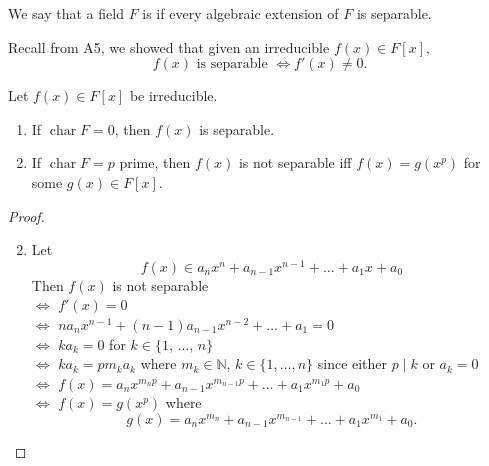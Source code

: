 \documentclass[notoc,notitlepage,nobib]{tufte-book}
\DeclareMathOperator{\Char}{char}
\begin{document}
\begin{defn}\label{defn:perfect_fields}
  We say that a field $F$ is  if every algebraic extension of
  $F$ is separable.
\end{defn}

\begin{note}
  Recall from A5, we showed that given an irreducible $f(x) \in F[x]$,
  \begin{equation*}
    f(x) \text{ is separable } \iff f'(x) \neq 0.
  \end{equation*}
\end{note}

\begin{propo}\label{propo:separability_and_the_characteristic_of_a_field}
  Let $f(x) \in F[x]$ be irreducible.
  \begin{enumerate}
    \item If $\Char F = 0$, then $f(x)$ is separable. 
    \item If $\Char F = p$ prime, then $f(x)$ is not separable iff $f(x) = g(x^p)$
      for some $g(x) \in F[x]$.
  \end{enumerate}
\end{propo}

\begin{proof}
  \begin{enumerate}
    \setcounter{enumi}{1}
    \item Let
      \begin{equation*}
        f(x) \in a_n x^n + a_{n - 1} x^{n - 1} + \hdots + a_1 x + a_0
      \end{equation*}
      Then $f(x)$ is not separable \\
      $\iff$ $f'(x) = 0$ \\
      $\iff$ $na_n x^{n - 1} + (n - 1)a_{n - 1} x^{n - 2} + \hdots + a_1 = 0$
        \\
      $\iff$ $ka_k = 0$ for $k \in \{ 1, \, \ldots, \, n \}$ \\
      $\iff$ $ka_k = pm_k a_k$ where $m_k \in \mathbb{N}$, $k \in \{ 1, \ldots,
        n \}$ since either $p \mid k$ or $a_k = 0$ \\
      $\iff$ $f(x) = a_n x^{m_n p} + a_{n - 1}x^{m_{n - 1} p} + \hdots + a_1
        x^{m_1 p} + a_0$ \\
      $\iff$ $f(x) = g(x^p)$ where
      \begin{equation*}
        g(x) = a_n x^{m_n} + a_{n - 1} x^{m_{n - 1}} + \hdots + a_1 x^{m_1} +
        a_0.
      \end{equation*}
  \end{enumerate}
\end{proof}
\end{document}
